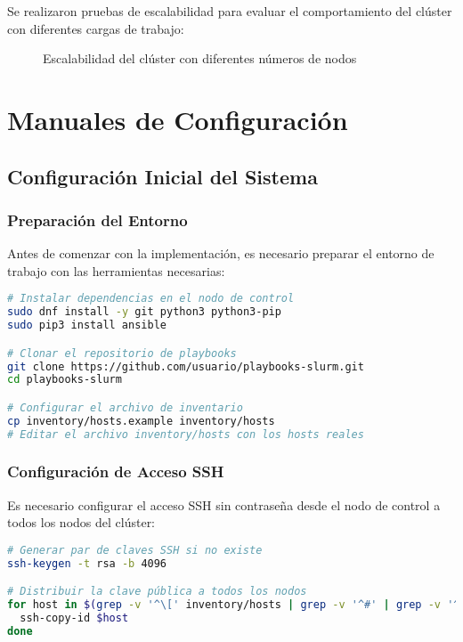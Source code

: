 \documentclass[12pt,a4paper]{report}
\begin{document}
Se realizaron pruebas de escalabilidad para evaluar el comportamiento del clúster con diferentes cargas de trabajo:

\begin{figure}[H]
\centering
\caption{Escalabilidad del clúster con diferentes números de nodos}
\label{fig:scalability_tests}
\end{figure}

\chapter{Manuales de Configuración}

\section{Configuración Inicial del Sistema}

\subsection{Preparación del Entorno}

Antes de comenzar con la implementación, es necesario preparar el entorno de trabajo con las herramientas necesarias:

\begin{lstlisting}[language=bash]
# Instalar dependencias en el nodo de control
sudo dnf install -y git python3 python3-pip
sudo pip3 install ansible

# Clonar el repositorio de playbooks
git clone https://github.com/usuario/playbooks-slurm.git
cd playbooks-slurm

# Configurar el archivo de inventario
cp inventory/hosts.example inventory/hosts
# Editar el archivo inventory/hosts con los hosts reales
\end{lstlisting}

\subsection{Configuración de Acceso SSH}

Es necesario configurar el acceso SSH sin contraseña desde el nodo de control a todos los nodos del clúster:

\begin{lstlisting}[language=bash]
# Generar par de claves SSH si no existe
ssh-keygen -t rsa -b 4096

# Distribuir la clave pública a todos los nodos
for host in $(grep -v '^\[' inventory/hosts | grep -v '^#' | grep -v '^$'); do
  ssh-copy-id $host
done
\end{lstlisting}
\end{document}
